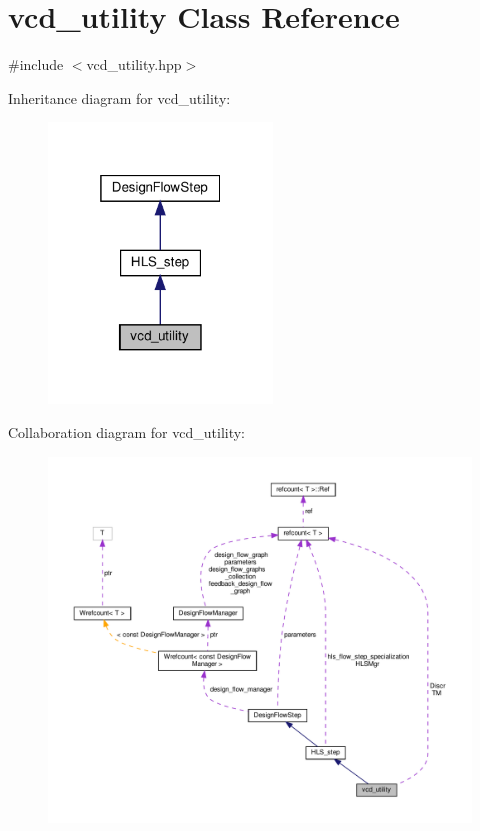 \hypertarget{classvcd__utility}{}\section{vcd\+\_\+utility Class Reference}
\label{classvcd__utility}


{\ttfamily \#include $<$vcd\+\_\+utility.\+hpp$>$}



Inheritance diagram for vcd\+\_\+utility\+:
\nopagebreak
\begin{figure}[H]
\begin{center}
\leavevmode
\includegraphics[width=169pt]{d1/d4c/classvcd__utility__inherit__graph}
\end{center}
\end{figure}


Collaboration diagram for vcd\+\_\+utility\+:
\nopagebreak
\begin{figure}[H]
\begin{center}
\leavevmode
\includegraphics[width=350pt]{d4/d07/classvcd__utility__coll__graph}
\end{center}
\end{figure}
